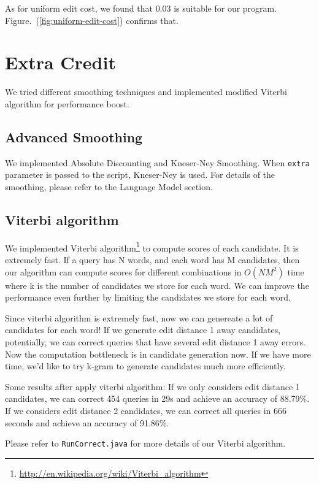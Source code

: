 \documentclass{article}
\begin{document}
As for uniform edit cost, we found that 0.03 is suitable for our program. Figure.~(\ref{fig:uniform-edit-cost}) confirms that.

\section{Extra Credit}

We tried different smoothing techniques and implemented modified Viterbi algorithm for performance boost.

\subsection{Advanced Smoothing}

We implemented Absolute Discounting and Kneser-Ney Smoothing. When \texttt{extra} parameter is passed to the script, Kneser-Ney is used. For details of the smoothing, please refer to the Language Model section.

\subsection{Viterbi algorithm}

We implemented Viterbi algorithm\footnote{\url{http://en.wikipedia.org/wiki/Viterbi\_algorithm}} to compute scores of each candidate. It is extremely fast. If a query has N words, and each word has M candidates, then our algorithm can compute scores for different combinations in $O(NM^2)$ time where k is the number of candidates we store for each word. We can improve the performance even further by limiting the candidates we store for each word.

Since viterbi algorithm is extremely fast, now we can genereate a lot of candidates for each word! If we generate edit distance 1 away candidates, potentially, we can correct queries that have several edit distance 1 away errors. Now the computation bottleneck is in candidate generation now. If we have more time, we'd like to try k-gram to generate candidates much more efficiently.

Some results after apply viterbi algorithm: If we only considers edit distance 1 candidates, we can correct 454 queries in 29s and achieve an accuracy of 88.79\%. If we considers edit distance 2 candidates, we can correct all queries in 666 seconds and achieve an accuracy of 91.86\%.

Please refer to \texttt{RunCorrect.java} for more details of our Viterbi algorithm.
\end{document}
